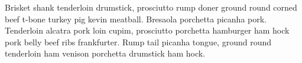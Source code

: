 
Brisket shank tenderloin drumstick, prosciutto rump doner ground round corned beef t-bone turkey pig 
kevin meatball. Bresaola porchetta picanha pork. Tenderloin alcatra pork loin cupim, prosciutto porchetta
hamburger ham hock pork belly beef ribs frankfurter. Rump tail picanha tongue, ground round tenderloin 
ham venison porchetta drumstick ham hock.